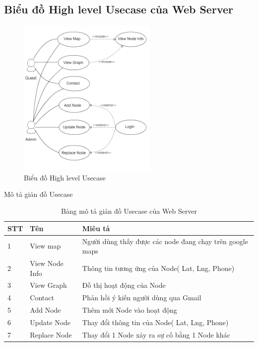 \subsection*{Biểu đồ High level Usecase của Web Server}
\begin{figure}[H]
\centering    
\includegraphics[width=0.6\textwidth]{usecase_diagram}
\caption[Biểu đồ High level Usecase]{Biểu đồ High level Usecase }
\label{fig:usecase_diagram}
\end{figure}
Mô tả giản đồ Usecase
\begin{table}[H]
\centering
\caption{Bảng mô tả giản đồ Usecase của Web Server}
\label{table:usewebsite}
\begin{tabular}{|l|l|l|}
\hline
STT & Tên            & Miêu tả                                                                                            \\ \hline
1   & View map       & Người dùng thấy được các node đang chạy trên google maps                                           \\ \hline
2   & View Node Info & Thông tin tương ứng của Node( Lat, Lng, Phone)                                                     \\ \hline
3   & View Graph     & Đồ thị hoạt động của Node
\\ \hline
4   & Contact        & Phản hồi ý kiến người dùng qua Gmail                                                               \\ \hline
5   & Add Node       & Thêm mới Node vào hoạt động                                                                        \\ \hline
6   & Update Node    & Thay đổi thông tin của Node( Lat, Lng, Phone)                                                      \\ \hline
7   & Replace Node   & Thay đổi 1 Node xảy ra sự cố bằng 1 Node khác                                                      \\ \hline
\end{tabular}
\end{table}




